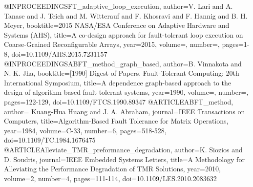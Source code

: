 @INPROCEEDINGS{FT_adaptive_loop_execution,
  author={V. {Lari} and A. {Tanase} and J. {Teich} and M. {Witterauf} and F. {Khosravi} and F. {Hannig} and B. H. {Meyer}},
  booktitle={2015 NASA/ESA Conference on Adaptive Hardware and Systems (AHS)}, 
  title={A co-design approach for fault-tolerant loop execution on Coarse-Grained Reconfigurable Arrays}, 
  year={2015},
  volume={},
  number={},
  pages={1-8},
  doi={10.1109/AHS.2015.7231157}
}
@INPROCEEDINGS{ABFT_method_graph_based,
	author={B. {Vinnakota} and N. K. {Jha}},
	booktitle={[1990] Digest of Papers. Fault-Tolerant Computing: 20th International Symposium}, 
	title={A dependence graph-based approach to the design of algorithm-based fault tolerant systems}, 
	year={1990},
	volume={},
	number={},
	pages={122-129},	
	doi={10.1109/FTCS.1990.89347}
}
@ARTICLE{ABFT_method,
	author={ {Kuang-Hua Huang} and J. A. {Abraham}},
	journal={IEEE Transactions on Computers}, 
	title={Algorithm-Based Fault Tolerance for Matrix Operations}, 
	year={1984},
	volume={C-33},
	number={6},
	pages={518-528},	
	doi={10.1109/TC.1984.1676475}
}
@ARTICLE{Alleviate_TMR_preformance_degradation,
	author={K. {Siozios} and D. {Soudris}},	
	journal={IEEE Embedded Systems Letters}, 	
	title={A Methodology for Alleviating the Performance Degradation of TMR Solutions}, 	
	year={2010},	
	volume={2},	
	number={4},	
	pages={111-114},
	doi={10.1109/LES.2010.2083632}
}

